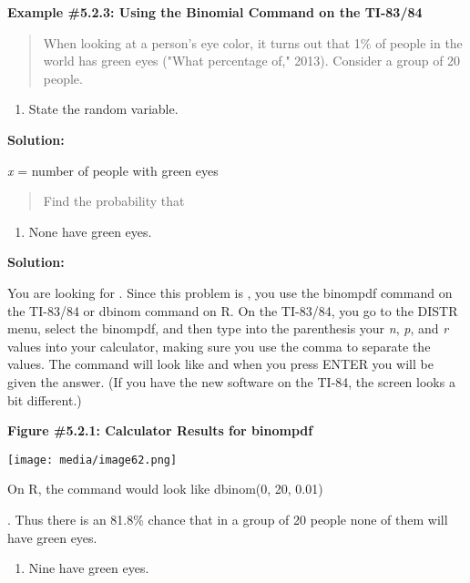 \documentclass[]{book}
\providecommand{\tightlist}{%
  \setlength{\itemsep}{0pt}\setlength{\parskip}{0pt}}
\begin{document}
\textbf{Example \#5.2.3: Using the Binomial Command on the TI-83/84}

\begin{quote}
When looking at a person's eye color, it turns out that 1\% of people
in the world has green eyes ("What percentage of," 2013). Consider a
group of 20 people.
\end{quote}

\begin{enumerate}
\def\labelenumi{\alph{enumi}.}
\tightlist
\item
  State the random variable.
\end{enumerate}

\textbf{Solution:}

\emph{x} = number of people with green eyes

\begin{quote}
Find the probability that
\end{quote}

\begin{enumerate}
\def\labelenumi{\alph{enumi}.}
\setcounter{enumi}{1}
\tightlist
\item
  None have green eyes.
\end{enumerate}

\textbf{Solution:}

You are looking for . Since this problem is , you use the binompdf
command on the TI-83/84 or dbinom command on R. On the TI-83/84, you go
to the DISTR menu, select the binompdf, and then type into the
parenthesis your \emph{n}, \emph{p}, and \emph{r} values into your calculator, making
sure you use the comma to separate the values. The command will look
like and when you press ENTER you will be given the answer. (If you have
the new software on the TI-84, the screen looks a bit different.)

\textbf{Figure \#5.2.1: Calculator Results for binompdf}

\texttt{[image: media/image62.png]}

On R, the command would look like dbinom(0, 20, 0.01)

. Thus there is an 81.8\% chance that in a group of 20 people none of
them will have green eyes.

\begin{enumerate}
\def\labelenumi{\alph{enumi}.}
\setcounter{enumi}{2}
\tightlist
\item
  Nine have green eyes.
\end{enumerate}
\end{document}
